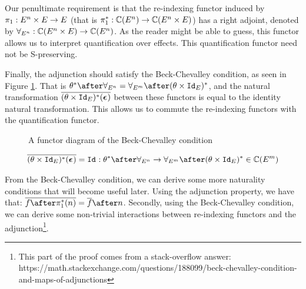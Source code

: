 \documentclass{Report}
\begin{document}
Our penultimate requirement is that the re-indexing functor induced by $\pi_1: E^n\times E\rightarrow E$ (that is $\pi_1^*: \mathbb{C}(E^n) \rightarrow \mathbb{C}(E^n\times E)$) has a right adjoint, denoted by $\forall_{E^n}: \mathbb{C}(E^n\times E) \rightarrow \mathbb{C}(E^n)$. As the reader might be able to guess, this functor allows us to interpret quantification over effects. This quantification functor need not be S-preserving.

Finally, the adjunction should satisfy the Beck-Chevalley condition, as seen in Figure \ref{BeckChevalleyDiagram}. That is $\theta\star\after\allEn = \allEm\after(\theta\times\Id{E})\star$, and the natural transformation $\overline{(\theta\times\texttt{Id}_{E})^*(\boldsymbol{\epsilon}_{})}$ between these functors is equal to the identity natural transformation. This allows us to commute the re-indexing functors with the quantification functor.

\begin{figure}
    \begin{framed}
        \centering
        
    \end{framed}
    \caption{A functor diagram of the Beck-Chevalley condition}
    \label{BeckChevalleyDiagram}
\end{figure}

\begin{align*}
    \bar{(\theta\times\Id{E})\star(\counit{})} = \Id{}: \theta\star\after\allEn \rightarrow \allEm\after(\theta\times\Id{E})\star\in \C(E^m)
\end{align*}

From the Beck-Chevalley condition, we can derive some more naturality conditions that will become useful later.
Using the adjunction property, we have that: $\bar{f\after\pstar(n)} = \bar{f}\after n$. Secondly, using the Beck-Chevalley condition, we can derive some non-trivial interactions between re-indexing functors and the adjunction\footnote{This part of the proof comes from a stack-overflow answer: https://math.stackexchange.com/questions/188099/beck-chevalley-condition-and-maps-of-adjunctions}. 
\end{document}
